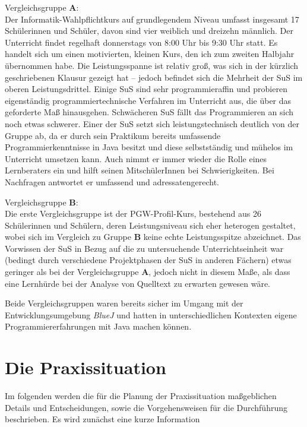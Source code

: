 \documentclass[paper=a4, DIV=13, BCOR=12mm, twoside=on, onecolumn=on, open = any, titlepage =on, parskip =half-, headsepline = on, footsepline = on, chapterprefix = on, sectionprefix = on, appendixprefix = off, fontsize = 11pt, numbers = noenddot, abstract = off]{scrreprt}
\begin{document}
Vergleichsgruppe \textsc{\textbf{A}}:\\
Der Informatik-Wahlpflichtkurs auf grundlegendem Niveau umfasst insgesamt 17 Schülerinnen und Schüler, davon sind vier weiblich und dreizehn männlich. Der Unterricht findet regelhaft donnerstags von 8:00 Uhr bis 9:30 Uhr statt. 
Es handelt sich um einen motivierten, kleinen Kurs, den ich zum zweiten Halbjahr übernommen habe. Die Leistungsspanne ist relativ groß, was sich in der kürzlich geschriebenen Klausur gezeigt hat – jedoch befindet sich die Mehrheit der SuS im oberen Leistungsdrittel. Einige SuS sind sehr programmieraffin und probieren eigenständig programmiertechnische Verfahren im Unterricht aus, die über das geforderte Maß hinausgehen. Schwächeren SuS fällt das Programmieren an sich noch etwas schwerer. Einer der SuS setzt sich leistungstechnisch deutlich von der Gruppe ab, da er durch sein Praktikum bereits umfassende Programmierkenntnisse in Java besitzt und diese selbstständig und mühelos im Unterricht umsetzen kann. Auch nimmt er immer wieder die Rolle eines Lernberaters ein und hilft seinen MitschülerInnen bei Schwierigkeiten. Bei Nachfragen antwortet er umfassend und adressatengerecht.

Vergleichsgruppe \textsc{\textbf{B}}:\\
Die erste Vergleichsgruppe ist der PGW-Profil-Kurs, bestehend aus 26 Schülerinnen und Schülern, deren Leistungsniveau sich eher heterogen gestaltet, wobei sich im Vergleich zu Gruppe \textsc{\textbf{B}} keine echte Leistungsspitze abzeichnet. Das Vorwissen der SuS in Bezug auf die zu untersuchende Unterrichtseinheit war (bedingt durch verschiedene Projektphasen der SuS in anderen Fächern) etwas geringer als bei der Vergleichsgruppe \textsc{\textbf{A}}, jedoch nicht in diesem Maße, als dass eine Lernhürde bei der Analyse von Quelltext zu erwarten gewesen wäre. 

Beide Vergleichsgruppen waren bereits sicher im Umgang mit der Entwicklungsumgebung \emph{BlueJ} und hatten in unterschiedlichen Kontexten eigene Programmiererfahrungen mit Java machen können.

\chapter{Die Praxissituation}
\onehalfspacing
 Im folgenden werden die für die Planung der Praxissituation maßgeblichen Details und Entscheidungen, sowie die Vorgehensweisen für die Durchführung beschrieben. Es wird zunächst eine kurze Information 
\par \singlespacing
\end{document}
